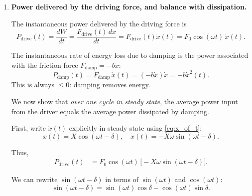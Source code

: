 \documentclass[12pt]{article}
\begin{document}
\begin{enumerate}
At $\omega = \omega_0$, \eqref{eq:avgE_simplified} gives
\[
\langle E \rangle_{\omega=\omega_0}
= \frac{m X_\text{res}^2}{4} (\omega_0^2 + \omega_0^2)
= \frac{m X_\text{res}^2}{4} (2\omega_0^2)
= \frac{m \omega_0^2 X_\text{res}^2}{2}.
\]

Insert $X_\text{res}$:
\[
\langle E \rangle_{\omega=\omega_0}
= \frac{m \omega_0^2}{2}
\left(\frac{F_0}{2 m \gamma \omega_0}\right)^2
= \frac{m \omega_0^2}{2}
\frac{F_0^2}{4 m^2 \gamma^2 \omega_0^2}
= \frac{F_0^2}{8 m \gamma^2}.
\]

So, at resonance,
\begin{equation}
\boxed{
\langle E \rangle_{\omega=\omega_0}
= \frac{F_0^2}{8 m \gamma^2}
= \frac{F_0^2}{8 m} \left(\frac{2m}{b}\right)^2
= \frac{F_0^2 m}{2 b^2}.
}
\end{equation}

This shows that the average stored mechanical energy at resonance grows as damping becomes smaller (since $\gamma = b/(2m)$).


\item \textbf{Power delivered by the driving force, and balance with dissipation.}

The instantaneous power delivered by the driving force is
\[
P_\text{drive}(t) = \frac{dW}{dt}=\frac{F_\text{drive}(t)\,dx }{dt} = F_\text{drive}(t)\dot{x}(t)
= F_0 \cos(\omega t)\, \dot{x}(t).
\]

The instantaneous rate of energy loss due to damping is the power associated with the friction force $F_\text{damp} = -b \dot{x}$:
\[
P_\text{damp}(t) = F_\text{damp} \, \dot{x}(t)
= (-b \dot{x}) \dot{x}
= - b \dot{x}^2(t).
\]
This is always $\le 0$: damping removes energy.

We now show that \emph{over one cycle in steady state}, the average power input from the driver equals the average power dissipated by damping.

First, write $\dot{x}(t)$ explicitly in steady state using \eqref{eq:x_of_t}:
\[
x(t) = X \cos(\omega t - \delta),
\quad
\dot{x}(t) = -X \omega \sin(\omega t - \delta).
\]

Thus,
\begin{align}
P_\text{drive}(t)
&= F_0 \cos(\omega t)\, \big[-X \omega \sin(\omega t - \delta)\big].
\end{align}

We can rewrite $\sin(\omega t - \delta)$ in terms of $\sin(\omega t)$ and $\cos(\omega t)$:
\[
\sin(\omega t - \delta)
= \sin(\omega t)\cos\delta - \cos(\omega t)\sin\delta.
\]


\end{enumerate}
\end{document}
